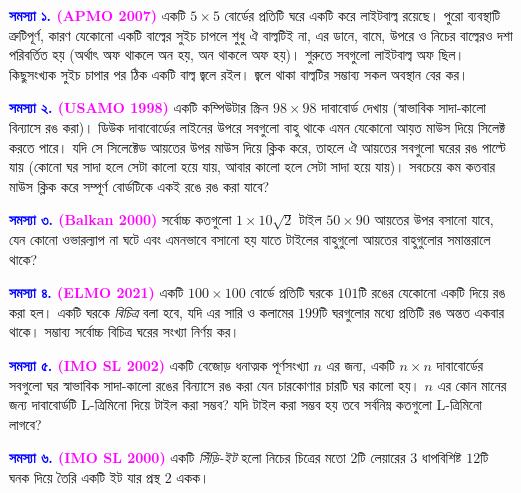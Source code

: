 \documentclass[11pt]{report}
\begin{document}
\begin{flushleft}

\textbf{\textcolor{blue}{সমস্যা ১.} \textcolor{magenta}{(APMO 2007)}} একটি $5 \times 5$ বোর্ডের প্রতিটি ঘরে একটি করে লাইটবাল্ব রয়েছে। পুরো ব্যবস্থাটি ত্রুটিপূর্ণ, কারণ যেকোনো একটি বাল্বের সুইচ চাপলে শুধু ঐ বাল্বটিই না, এর ডানে, বামে, উপরে ও নিচের বাল্বেরও দশা পরিবর্তিত হয় (অর্থাৎ অফ থাকলে অন হয়, অন থাকলে অফ হয়)। শুরুতে সবগুলো লাইটবাল্ব অফ ছিল। কিছুসংখ্যক সুইচ চাপার পর ঠিক একটি বাল্ব জ্বলে রইল। জ্বলে থাকা বাল্বটির সম্ভাব্য সকল অবস্থান বের কর।

\textbf{\textcolor{blue}{সমস্যা ২.} \textcolor{magenta}{(USAMO 1998)}}
একটি কম্পিউটার স্ক্রিন $98 \times 98$ দাবাবোর্ড দেখায় (স্বাভাবিক সাদা-কালো বিন্যাসে রঙ করা)। ডিউক দাবাবোর্ডের লাইনের উপরে সবগুলো বাহু থাকে এমন যেকোনো আয়ত মাউস দিয়ে সিলেক্ট করতে পারে। যদি সে সিলেক্টেড আয়তের উপর মাউস দিয়ে ক্লিক করে, তাহলে ঐ আয়তের সবগুলো ঘরের রঙ পাল্টে যায় (কোনো ঘর সাদা হলে সেটা কালো হয়ে যায়, আবার কালো হলে সেটা সাদা হয়ে যায়)। সবচেয়ে কম কতবার মাউস ক্লিক করে সম্পূর্ণ বোর্ডটিকে একই রঙে রঙ করা যাবে?

\textbf{\textcolor{blue}{সমস্যা ৩.} \textcolor{magenta}{(Balkan 2000)}} সর্বোচ্চ কতগুলো $1 \times 10\sqrt{2}$ টাইল $50 \times 90$ আয়তের উপর বসানো যাবে, যেন কোনো ওভারল্যাপ না ঘটে এবং এমনভাবে বসানো হয় যাতে টাইলের বাহুগুলো আয়তের বাহুগুলোর সমান্তরালে থাকে?

\textbf{\textcolor{blue}{সমস্যা ৪.} \textcolor{magenta}{(ELMO 2021)}} একটি $100 \times 100$ বোর্ডে প্রতিটি ঘরকে $101$টি রঙের যেকোনো একটি দিয়ে রঙ করা হল। একটি ঘরকে \textit{বিচিত্র} বলা হবে, যদি এর সারি ও কলামের $199$টি ঘরগুলোর মধ্যে প্রতিটি রঙ অন্তত একবার থাকে। সম্ভাব্য সর্বোচ্চ বিচিত্র ঘরের সংখ্যা নির্ণয় কর।

\textbf{\textcolor{blue}{সমস্যা ৫.} \textcolor{magenta}{(IMO SL 2002)}} একটি বেজোড় ধনাত্মক পূর্ণসংখ্যা $n$ এর জন্য, একটি $n \times n$ দাবাবোর্ডের সবগুলো ঘর স্বাভাবিক সাদা-কালো রঙের বিন্যাসে রঙ করা যেন চারকোণার চারটি ঘর কালো হয়। $n$ এর কোন মানের জন্য দাবাবোর্ডটি L-ত্রিমিনো দিয়ে টাইল করা সম্ভব? যদি টাইল করা সম্ভব হয় তবে সর্বনিম্ন কতগুলো L-ত্রিমিনো লাগবে?

\textbf{\textcolor{blue}{সমস্যা ৬.} \textcolor{magenta}{(IMO SL 2000)}} একটি \textit{সিঁড়ি-ইট} হলো নিচের চিত্রের মতো $2$টি লেয়ারের $3$ ধাপবিশিষ্ট $12$টি ঘনক দিয়ে তৈরি একটি ইট যার প্রস্থ $2$ একক।

\begin{center}
\end{center}


\end{flushleft}
\end{document}
